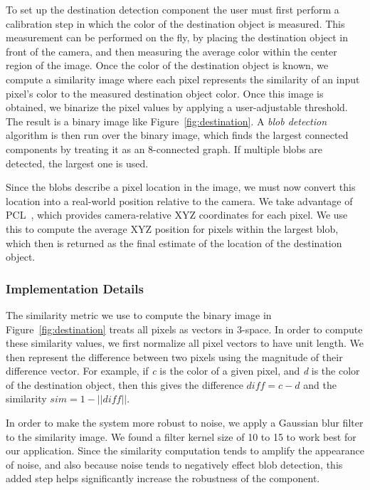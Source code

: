 To set up the destination detection component the user must first perform a
calibration step in which the color of the destination object is measured.
This measurement can be performed on the fly, by placing the
destination object in front of the camera, and then measuring the average 
color within the center region of the image. Once the color of the destination
object is known, we compute a similarity image where each pixel represents the 
similarity of an input pixel's color to the measured destination object color. Once 
this image is obtained, we binarize the pixel values by applying a 
user-adjustable threshold. The result is a binary image like
Figure~\ref{fig:destination}. A \emph{blob detection} algorithm is then run over the 
binary image, which finds the largest connected components by treating it as an 
8-connected graph. If multiple blobs are detected, the largest one is used.

Since the blobs describe a pixel location in the image, we must now convert 
this location into a real-world position relative to the camera. We take
advantage of PCL~\cite{pcl-website}, which provides camera-relative XYZ coordinates
for each pixel. We use this to compute the average XYZ position for pixels
within the largest blob, which then is returned as the final estimate of the location
of the destination object. 


\subsubsection{Implementation Details}
\label{sec:technical-dest-impl}

The similarity metric we use to compute the binary image in Figure~\ref{fig:destination}
treats all pixels as vectors in 3-space. In order
to compute these similarity values, we first normalize all pixel vectors
to have unit length. We then represent the difference between two pixels using the
magnitude of their difference vector. For example, if \emph{c} is the color of a
given pixel, and \emph{d} is the color of the destination object, then this gives the 
difference \begin{math} \textit{diff} = c - d \end{math} and the similarity 
\begin{math}\textit{sim} = 1 - ||\textit{diff}|| \end{math}.

In order to make the system more robust to noise, we apply a Gaussian blur
filter to the similarity image. We found a filter kernel size of 10 to 15 to work 
best for our application. Since the similarity computation tends
to amplify the appearance of noise, and also because noise tends to
negatively effect blob detection, this added step helps significantly increase
the robustness of the component.

